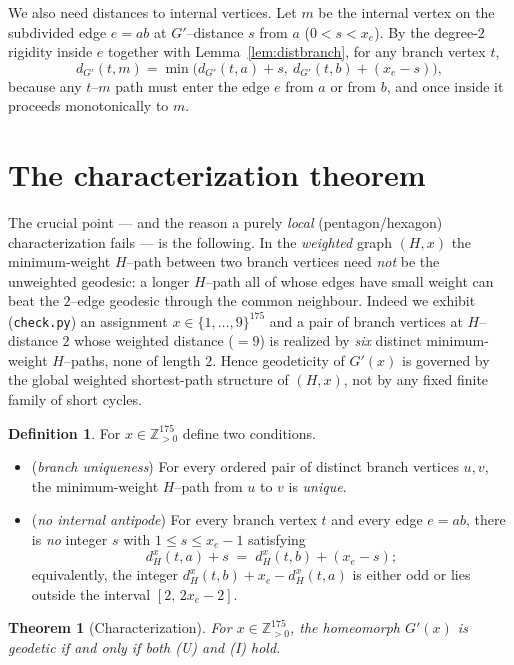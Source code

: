 \documentclass{amsart}
\newtheorem{theorem}{Theorem}
\theoremstyle{definition}
\newtheorem{definition}{Definition}
\begin{document}
We also need distances to internal vertices. Let $m$ be the internal vertex on
the subdivided edge $e=ab$ at $G'$--distance $s$ from $a$ ($0<s<x_e$). By the
degree-$2$ rigidity inside $e$ together with Lemma~\ref{lem:distbranch}, for any
branch vertex $t$,
\begin{equation}\label{eq:internaldist}
d_{G'}(t,m)=\min\big(d_{G'}(t,a)+s,\ d_{G'}(t,b)+(x_e-s)\big),
\end{equation}
because any $t$--$m$ path must enter the edge $e$ from $a$ or from $b$, and
once inside it proceeds monotonically to $m$.

\section{The characterization theorem}

The crucial point --- and the reason a purely \emph{local} (pentagon/hexagon)
characterization fails --- is the following. In the \emph{weighted} graph
$(H,x)$ the minimum-weight $H$--path between two branch vertices need \emph{not}
be the unweighted geodesic: a longer $H$--path all of whose edges have small
weight can beat the $2$--edge geodesic through the common neighbour. Indeed we
exhibit (\texttt{check.py}) an assignment $x\in\{1,\dots,9\}^{175}$ and a pair of
branch vertices at $H$--distance $2$ whose weighted distance ($=9$) is realized
by \emph{six} distinct minimum-weight $H$--paths, none of length $2$. Hence
geodeticity of $G'(x)$ is governed by the global weighted shortest-path
structure of $(H,x)$, not by any fixed finite family of short cycles.

\begin{definition}\label{def:conditions}
For $x\in\mathbb Z_{>0}^{175}$ define two conditions.
\begin{itemize}
\item[\textnormal{(U)}] (\emph{branch uniqueness}) For every ordered pair of
distinct branch vertices $u,v$, the minimum-weight $H$--path from $u$ to $v$ is
\emph{unique}.
\item[\textnormal{(I)}] (\emph{no internal antipode}) For every branch vertex
$t$ and every edge $e=ab$, there is \emph{no} integer $s$ with $1\le s\le x_e-1$
satisfying
\[
d^x_H(t,a)+s \;=\; d^x_H(t,b)+(x_e-s);
\]
equivalently, the integer $d^x_H(t,b)+x_e-d^x_H(t,a)$ is either odd or lies
outside the interval $[2,\,2x_e-2]$.
\end{itemize}
\end{definition}

\begin{theorem}[Characterization]\label{thm:main}
For $x\in\mathbb Z_{>0}^{175}$, the homeomorph $G'(x)$ is geodetic if and only if
both \textnormal{(U)} and \textnormal{(I)} hold.
\end{theorem}
\end{document}
